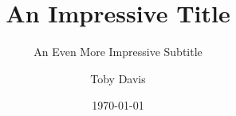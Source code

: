 \title{An Impressive Title}
\subtitle{An Even More Impressive Subtitle}

\author{Toby Davis}
\date{\today}

\pagestyle{fancy}
\fancyhf{}


\fancyhf[ch]{\MyTitle}


\maketitle
